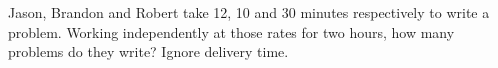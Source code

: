 Jason, Brandon and Robert take 12, 10 and 30 minutes respectively to write a problem. Working independently at those rates for two hours, how many problems do they write? Ignore delivery time.
